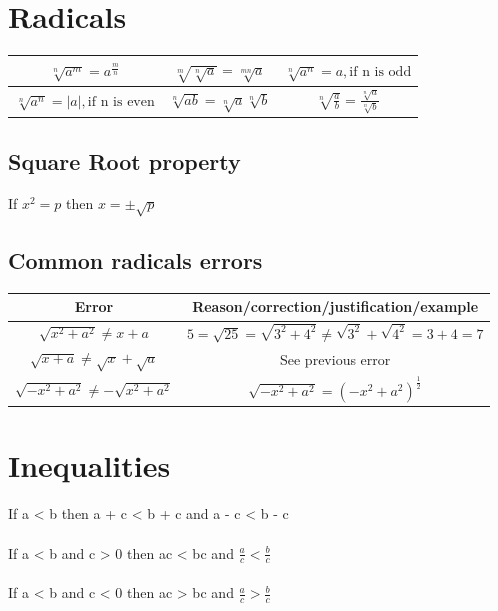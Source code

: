 \documentclass[10pt,onecolumn]{article}
\begin{document}
{%
\section{Radicals}
\begin{center}
{\renewcommand{\arraystretch}{2}
\begin{tabular}[c]{| c | c | c |}
\hline
$\sqrt[n]{a^m} = a^{\frac{m}{n}}$ &
$\sqrt[m]{\sqrt[n]{a}} = \sqrt[mn]{a}$ &
$\sqrt[n]{a^n} = a, \text{if n is odd} $ \\
\hline
$\sqrt[n]{a^n} = |a|, \text{if n is even} $ &
$\sqrt[n]{ab} = \sqrt[n]{a}\sqrt[n]{b}$ &
$\sqrt[n]{\frac{a}{b}} = \frac{\sqrt[n]{a}}{\sqrt[n]{b}}$ \\
\hline
\end{tabular}}
\end{center}

\subsection{Square Root property}
If $ x^2 = p $ then $ x = \pm \sqrt{p}$

\subsection{Common radicals errors}

\begin{center}
{\renewcommand{\arraystretch}{2}
\begin{tabular}{| c | c | }
\hline
Error & Reason/correction/justification/example \\
\hline
$\sqrt{x^2 + a^2} \neq x + a $ & $5 = \sqrt{25} = \sqrt{3^2 + 4^2} \neq \sqrt{3^2} + \sqrt{4^2} = 3 + 4 = 7 $ \\
\hline
$\sqrt{x + a} \neq \sqrt{x} + \sqrt{a} $ & See previous error \\
\hline
$\sqrt{-x^2 + a^2} \neq -\sqrt{x^2 + a^2} $ & $\sqrt{-x^2 + a^2} = (-x^2 + a^2)^\frac{1}{2}$ \\
\hline
\end{tabular}}
\end{center}

\section{Inequalities}
If a < b then a + c < b + c and a - c < b - c \\\\
If a < b and c > 0 then ac < bc and $\frac{a}{c} < \frac{b}{c}$ \\\\
If a < b and c < 0 then ac > bc and $\frac{a}{c} > \frac{b}{c}$ \\\\

}
\end{document}
